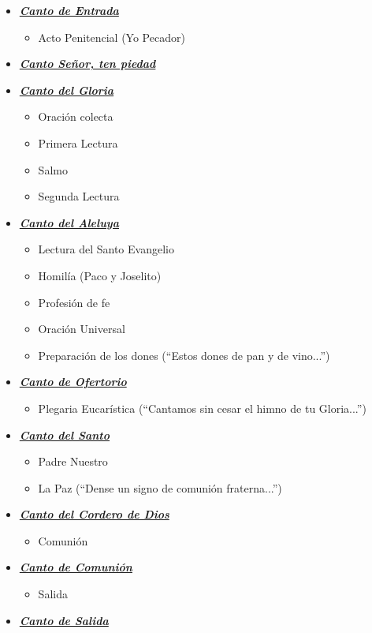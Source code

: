 {\large
\begin{itemize}
\item \textit{\hyperlink{entrada}{\textbf{Canto de Entrada}}}
\begin{itemize}
\item Acto Penitencial (Yo Pecador)
\end{itemize}
\item \textit{\hyperlink{piedad}{\textbf{Canto Señor, ten piedad}}}
\item \textit{\hyperlink{gloria}{\textbf{Canto del Gloria}}}
\begin{itemize}
\item Oración colecta
\item Primera Lectura
\item Salmo
\item Segunda Lectura
\end{itemize}
\item \textit{\hyperlink{aleluya}{\textbf{Canto del Aleluya}}}
\begin{itemize}
\item Lectura del Santo Evangelio
\item Homilía (Paco y Joselito)
\item Profesión de fe
\item Oración Universal
\item Preparación de los dones (``Estos dones de pan y de vino...'')
\end{itemize}
\item \textit{\hyperlink{ofertorio}{\textbf{Canto de Ofertorio}}}
\begin{itemize}
\item Plegaria Eucarística (``Cantamos sin cesar el himno de tu Gloria...'')
\end{itemize}
\item \textit{\hyperlink{santo}{\textbf{Canto del Santo}}}
\begin{itemize}
\item Padre Nuestro
\item La Paz (``Dense un signo de comunión fraterna...'')
\end{itemize}
\item \textit{\hyperlink{cordero}{\textbf{Canto del Cordero de Dios}}}
\begin{itemize}
\item Comunión
\end{itemize}
\item\textit{\hyperlink{comunion}{\textbf{Canto de Comunión}}}
\begin{itemize}
\item Salida
\end{itemize}
\item \textit{\hyperlink{salida}{\textbf{Canto de Salida}}}
\end{itemize}
}
